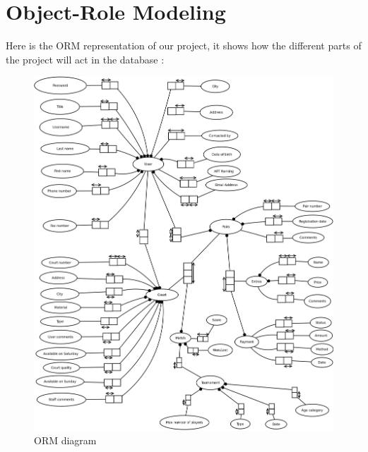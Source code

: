 \section{Object-Role Modeling}

Here is the ORM representation of our project, it shows how the different
parts of the project will act in the database :


\begin{figure}[!ht]
    \centering
    \includegraphics[width=\linewidth]{ORM.png}
    \caption{ORM diagram}
\end{figure}
\FloatBarrier
